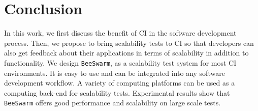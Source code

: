 \section{Conclusion}
\label{conclusion}
In this work, we first discuss the benefit of CI in the software development process. Then, we propose to bring scalability tests to CI so that developers can also get feedback about their applications in terms of scalability in addition to functionality. We design \texttt{BeeSwarm}, as a scalability test system for most CI environments. It is easy to use and can be integrated into any software development workflow. A variety of computing platforms can be used as a computing back-end for scalability tests. Experimental results show that \texttt{BeeSwarm} offers good performance and scalability on large scale tests. %
